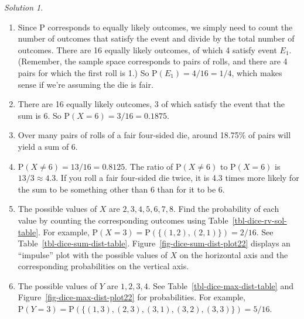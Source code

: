 \documentclass[
  letterpaper,
  DIV=11,
  numbers=noendperiod]{scrreprt}
\providecommand{\tightlist}{%
  \setlength{\itemsep}{0pt}\setlength{\parskip}{0pt}}
\theoremstyle{plain}
\theoremstyle{definition}
\theoremstyle{definition}
\theoremstyle{definition}
\theoremstyle{remark}
\newtheorem{refsolution}{Solution}[chapter]
\begin{document}
\begin{tcolorbox}[enhanced jigsaw, opacityback=0, rightrule=.15mm, coltitle=black, colframe=quarto-callout-tip-color-frame, toprule=.15mm, colbacktitle=quarto-callout-tip-color!10!white, opacitybacktitle=0.6, left=2mm, toptitle=1mm, breakable, title={Solution (click to expand)}, bottomtitle=1mm, colback=white, leftrule=.75mm, titlerule=0mm, arc=.35mm, bottomrule=.15mm]

\begin{refsolution}
\leavevmode

\begin{enumerate}
\def\labelenumi{\arabic{enumi}.}
\tightlist
\item
  Since \(\textrm{P}\) corresponds to equally likely outcomes, we simply
  need to count the number of outcomes that satisfy the event and divide
  by the total number of outcomes. There are 16 equally likely outcomes,
  of which 4 satisfy event \(E_1\). (Remember, the sample space
  corresponds to pairs of rolls, and there are 4 pairs for which the
  first roll is 1.) So \(\textrm{P}(E_1) = 4 / 16 = 1/4\), which makes
  sense if we're assuming the die is fair.
\item
  There are 16 equally likely outcomes, 3 of which satisfy the event
  that the sum is 6. So \(\textrm{P}(X = 6) = 3 / 16 = 0.1875\).
\item
  Over many pairs of rolls of a fair four-sided die, around 18.75\% of
  pairs will yield a sum of 6.
\item
  \(\textrm{P}(X\neq 6) = 13/16 = 0.8125\). The ratio of
  \(\textrm{P}(X \neq 6)\) to \(\textrm{P}(X = 6)\) is
  \(13/3 \approx 4.3\). If you roll a fair four-sided die twice, it is
  4.3 times more likely for the sum to be something other than 6 than
  for it to be 6.
\item
  The possible values of \(X\) are \(2, 3, 4, 5, 6, 7, 8\). Find the
  probability of each value by counting the corresponding outcomes using
  Table~\ref{tbl-dice-rv-sol-table}. For example,
  \(\textrm{P}(X = 3) = \textrm{P}(\{(1, 2), (2, 1)\}) = 2/16\). See
  Table~\ref{tbl-dice-sum-dist-table}.
  Figure~\ref{fig-dice-sum-dist-plot22} displays an ``impulse'' plot
  with the possible values of \(X\) on the horizontal axis and the
  corresponding probabilities on the vertical axis.
\item
  The possible values of \(Y\) are \(1, 2, 3, 4\). See
  Table~\ref{tbl-dice-max-dist-table} and
  Figure~\ref{fig-dice-max-dist-plot22} for probabilities. For example,
  \(\textrm{P}(Y = 3) = \textrm{P}(\{(1, 3), (2, 3), (3, 1), (3, 2), (3, 3)\}) = 5/16\).

\end{enumerate}
\end{refsolution}
\end{tcolorbox}
\end{document}
